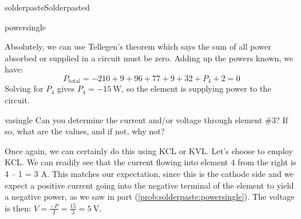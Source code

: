 \begin{mainquestion}{solderpaste}{Solderpasted}
\begin{partquestion}{powersingle}
\begin{answer}
Absolutely, we can use Tellegen’s theorem which says the sum of all power absorbed or supplied in a circuit must be zero.  Adding up the powers known, we have:
\[
P_{\text{total}}=-210+9+96+77+9+32+P_4+2=0
\]
Solving for $P_4$ gives $P_4=\qty{-15}{\watt}$, so the element is supplying power to the circuit. 

\end{answer}
\end{partquestion}

\begin{partquestion}{vasingle}
{Can you determine the current and/or voltage through element \#3?  If so, what are the values, and if not, why not?}

\begin{answer}
Once again, we can certainly do this using KCL or KVL.  Let’s choose to employ KCL.  We can readily see that the current flowing into element 4 from the right is 4 – 1 = 3 A.  This matches our expectation, since this is the cathode side and we expect a positive current going into the negative terminal of the element to yield a negative power, as we saw in part (\cref{prob:solderpaste:powersingle}).  The voltage is then: $V=\frac{-P}{I}=\frac{15}{3}=\qty{5}{\volt}.$
\end{answer}
\end{partquestion}

\end{mainquestion}